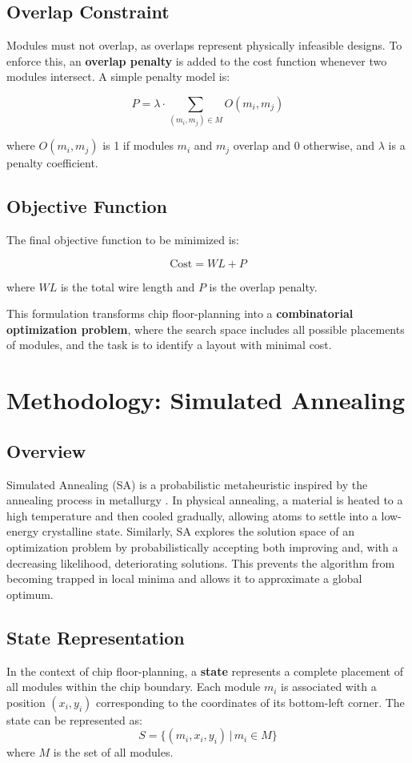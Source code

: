 \documentclass[9pt,a4paper,twoside]{rho-class/rho}
\begin{document}
\subsection{Overlap Constraint}
Modules must not overlap, as overlaps represent physically infeasible designs. To enforce this, an \textbf{overlap penalty} is added to the cost function whenever two modules intersect. A simple penalty model is:  

\[
P = \lambda \cdot \sum_{(m_i, m_j) \in M} O(m_i, m_j)
\]

where $O(m_i, m_j)$ is 1 if modules $m_i$ and $m_j$ overlap and 0 otherwise, and $\lambda$ is a penalty coefficient.  

\subsection{Objective Function}
The final objective function to be minimized is:  

\[
\text{Cost} = WL + P
\]

where $WL$ is the total wire length and $P$ is the overlap penalty.  

This formulation transforms chip floor-planning into a \textbf{combinatorial optimization problem}, where the search space includes all possible placements of modules, and the task is to identify a layout with minimal cost.  

\section{Methodology: Simulated Annealing}

\subsection{Overview}
Simulated Annealing (SA) is a probabilistic metaheuristic inspired by the annealing process in metallurgy \cite{Kirkpatrick}. In physical annealing, a material is heated to a high temperature and then cooled gradually, allowing atoms to settle into a low-energy crystalline state. Similarly, SA explores the solution space of an optimization problem by probabilistically accepting both improving and, with a decreasing likelihood, deteriorating solutions. This prevents the algorithm from becoming trapped in local minima and allows it to approximate a global optimum.

\subsection{State Representation}
In the context of chip floor-planning, a \textbf{state} represents a complete placement of all modules within the chip boundary. Each module $m_i$ is associated with a position $(x_i, y_i)$ corresponding to the coordinates of its bottom-left corner. The state can be represented as:
\[
S = \{ (m_i, x_i, y_i) \,|\, m_i \in M \}
\]
where $M$ is the set of all modules.
\end{document}
